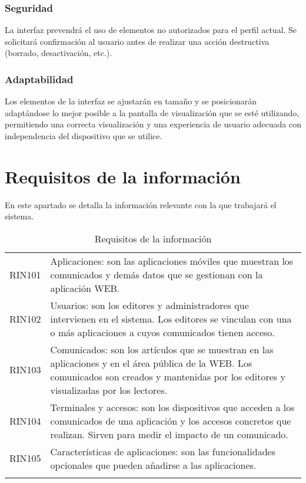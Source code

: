 \subsubsection*{Seguridad}
La interfaz prevendrá el uso de elementos no autorizados para el perfil actual. Se solicitará confirmación al usuario antes de realizar una acción  destructiva (borrado, desactivación, etc.).
\subsubsection*{Adaptabilidad}
Los elementos de la interfaz se ajustarán en tamaño y se posicionarán adaptándose lo mejor posible a la pantalla de visualización que se esté utilizando, permitiendo una correcta visualización y una experiencia de usuario adecuada con independencia del dispositivo que se utilice.

\section{Requisitos de la información}
En este apartado se detalla la información relevante con la que trabajará el sistema.
\label{cuadro:requisitos-de-la-informacion}
\begin{longtable}{lp{13.7cm}}
  RIN101\label{RIN101} & Aplicaciones: son las aplicaciones móviles que muestran los comunicados y demás datos que se gestionan con la aplicación WEB. \\
  RIN102\label{RIN102} & Usuarios: son los editores y administradores que intervienen en el sistema. Los editores se vinculan con una o más aplicaciones a cuyos comunicados tienen acceso. \\
  RIN103\label{RIN103} & Comunicados: son los artículos que se muestran en las aplicaciones y en el área pública de la WEB. Los comunicados son creados y mantenidas por los editores y visualizadas por los lectores. \\
  RIN104\label{RIN104} & Terminales y accesos: son los dispositivos que acceden a los comunicados de una aplicación y los accesos concretos que realizan. Sirven para medir el impacto de un comunicado.\\
  RIN105\label{RIN105} & Características de aplicaciones: son las funcionalidades opcionales que pueden añadirse a las aplicaciones. \\
  \caption{Requisitos de la información} \\
\end{longtable}